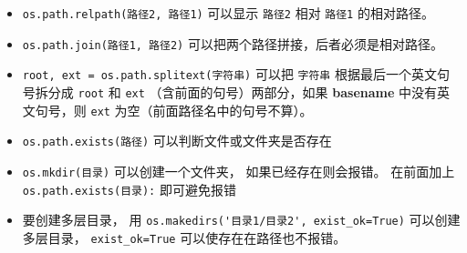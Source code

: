 \begin{itemize}
\item \verb`os.path.relpath(路径2, 路径1)` 可以显示 \verb`路径2` 相对 \verb`路径1` 的相对路径。
\item \verb`os.path.join(路径1, 路径2)` 可以把两个路径拼接，后者必须是相对路径。
\item \verb`root, ext = os.path.splitext(字符串)` 可以把 \verb`字符串` 根据最后一个英文句号拆分成 \verb`root` 和 \verb`ext` （含前面的句号）两部分，如果 \textbf{basename} 中没有英文句号，则 \verb`ext` 为空（前面路径名中的句号不算）。
\item \verb`os.path.exists(路径)` 可以判断文件或文件夹是否存在
\item \verb`os.mkdir(目录)` 可以创建一个文件夹， 如果已经存在则会报错。 在前面加上 \verb`os.path.exists(目录):` 即可避免报错
\item 要创建多层目录， 用 \verb`os.makedirs('目录1/目录2', exist_ok=True)` 可以创建多层目录， \verb`exist_ok=True` 可以使存在在路径也不报错。
\end{itemize}

